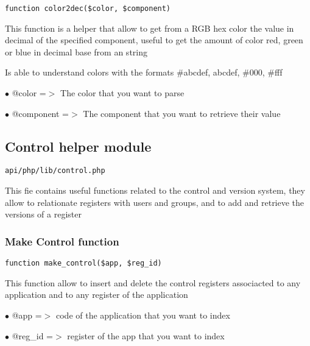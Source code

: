 \documentclass[a4paper]{article}
\begin{document}
\begin{lstlisting}
function color2dec($color, $component)
\end{lstlisting}

This function is a helper that allow to get from a RGB hex color the value
in decimal of the specified component, useful to get the amount of color
red, green or blue in decimal base from an string

Is able to understand colors with the formats \#abcdef, abcdef, \#000, \#fff

\begin{compactitem}
\item[\color{myblue}$\bullet$] @color     =$>$ The color that you want to parse
\item[\color{myblue}$\bullet$] @component =$>$ The component that you want to retrieve their value
\end{compactitem}

\hypertarget{toc397}{}
\subsection{Control helper module}

\begin{lstlisting}
api/php/lib/control.php
\end{lstlisting}

This fie contains useful functions related to the control and version system, they allow to
relationate registers with users and groups, and to add and retrieve the versions of a register

\hypertarget{toc398}{}
\subsubsection{Make Control function}

\begin{lstlisting}
function make_control($app, $reg_id)
\end{lstlisting}

This function allow to insert and delete the control registers associacted
to any application and to any register of the application

\begin{compactitem}
\item[\color{myblue}$\bullet$] @app    =$>$ code of the application that you want to index
\item[\color{myblue}$\bullet$] @reg\_id =$>$ register of the app that you want to index
\end{compactitem}
\end{document}
